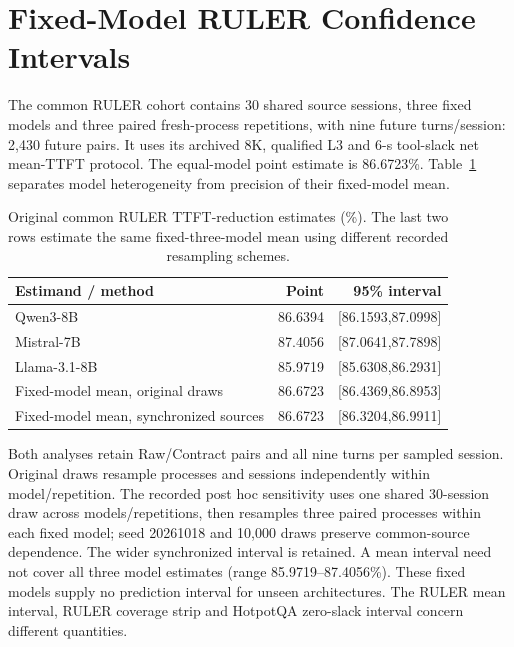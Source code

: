 \section{Fixed-Model RULER Confidence Intervals}
\label{sec:s-ruler-ci}
The common RULER cohort contains 30 shared source sessions, three fixed models and three paired fresh-process repetitions, with nine future turns/session: 2,430 future pairs. It uses its archived 8K, qualified L3 and 6-s tool-slack net mean-TTFT protocol. The equal-model point estimate is 86.6723\%. Table~\ref{tab:s-ruler-ci} separates model heterogeneity from precision of their fixed-model mean.

\begin{table}[t]
\centering\footnotesize
\caption{Original common RULER TTFT-reduction estimates (\%). The last two rows estimate the same fixed-three-model mean using different recorded resampling schemes.}
\label{tab:s-ruler-ci}
\begin{tabular}{@{}lrr@{}}
\toprule
Estimand / method & Point & 95\% interval\\
\midrule
Qwen3-8B & 86.6394 & [86.1593,87.0998]\\
Mistral-7B & 87.4056 & [87.0641,87.7898]\\
Llama-3.1-8B & 85.9719 & [85.6308,86.2931]\\
Fixed-model mean, original draws & 86.6723 & [86.4369,86.8953]\\
Fixed-model mean, synchronized sources & 86.6723 & [86.3204,86.9911]\\
\bottomrule
\end{tabular}
\end{table}

Both analyses retain Raw/Contract pairs and all nine turns per sampled session. Original draws resample processes and sessions independently within model/repetition. The recorded post hoc sensitivity uses one shared 30-session draw across models/repetitions, then resamples three paired processes within each fixed model; seed 20261018 and 10,000 draws preserve common-source dependence. The wider synchronized interval is retained. A mean interval need not cover all three model estimates (range 85.9719--87.4056\%). These fixed models supply no prediction interval for unseen architectures. The RULER mean interval, RULER coverage strip and HotpotQA zero-slack interval concern different quantities.

